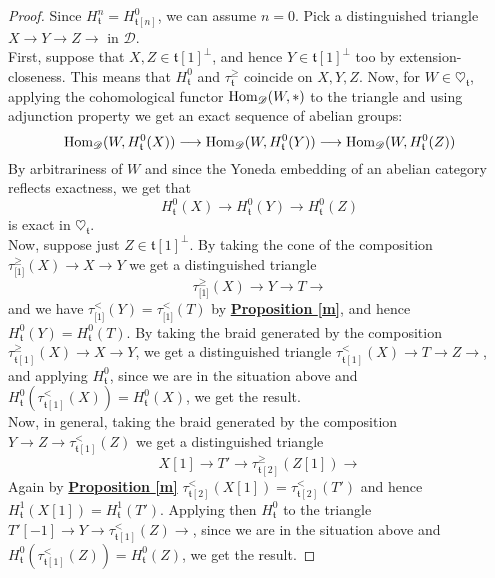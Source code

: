 \begin{proof}
Since $H^n_{\mathfrak{t}}=H^0_{\mathfrak{t}[n]}$, we can assume $n=0$. Pick a distinguished triangle $X \longrightarrow Y \longrightarrow Z \longrightarrow$ in $\mathscr{D}$. \\
First, suppose that $X,Z \in \mathfrak{t}[1]^{\perp}$, and hence $Y \in \mathfrak{t}[1]^{\perp}$ too by extension-closeness. This means that $H^0_{\mathfrak{t}}$ and $\tau^{\ge}_{\mathfrak{t}}$ coincide on $X,Y,Z$. Now, for $W \in \heartsuit_{\mathfrak{t}}$, applying the cohomological functor $\textnormal{Hom}_{\mathscr{D}}(W,*)$ to the triangle and using adjunction property we get an exact sequence of abelian groups: $$\textnormal{Hom}_{\mathscr{D}}(W,H_{\mathfrak{t}}^0(X)) \longrightarrow \textnormal{Hom}_{\mathscr{D}}(W,H_{\mathfrak{t}}^0(Y)) \longrightarrow \textnormal{Hom}_{\mathscr{D}}(W,H_{\mathfrak{t}}^0(Z))$$
By arbitrariness of $W$ and since the Yoneda embedding of an abelian category reflects exactness, we get that $$H_{\mathfrak{t}}^0(X) \longrightarrow H_{\mathfrak{t}}^0(Y) \longrightarrow H_{\mathfrak{t}}^0(Z)$$ is exact in $\heartsuit_{\mathfrak{t}}$. \\
Now, suppose just $Z \in \mathfrak{t}[1]^{\perp}$. By taking the cone of the composition $\tau^{\ge }_{\mathfrak[1]}(X) \longrightarrow X \longrightarrow Y$ we get a distinguished triangle $$\tau^{\ge }_{\mathfrak[1]}(X) \longrightarrow Y \longrightarrow T \longrightarrow $$ and we have $\tau^<_{\mathfrak[1]}(Y)=\tau^<_{\mathfrak[1]}(T)$ by \hyperref[m]{\textbf{Proposition \ref*{m}}}, and hence $H^0_{\mathfrak{t}}(Y)=H^0_{\mathfrak{t}}(T)$. By taking the braid generated by the composition $\tau^{\ge}_{\mathfrak{t}[1]}(X) \longrightarrow X \longrightarrow Y$, we get a distinguished triangle $\tau^{<}_{\mathfrak{t}[1]}(X) \longrightarrow T \longrightarrow Z \longrightarrow $, and applying $H^0_{\mathfrak{t}}$, since we are in the situation above and $H^0_{\mathfrak{t}}(\tau^{<}_{\mathfrak{t}[1]}(X))=H^0_{\mathfrak{t}}(X)$, we get the result. \\
Now, in general, taking the braid generated by the composition $Y \longrightarrow Z  \longrightarrow \tau^{<}_{\mathfrak{t}[1]}(Z)$ we get a distinguished triangle $$X[1] \longrightarrow T' \longrightarrow \tau^{\ge }_{\mathfrak{t}[2]}(Z[1]) \longrightarrow $$
Again by \hyperref[m]{\textbf{Proposition \ref*{m}}} $\tau^{<}_{\mathfrak{t}[2]}(X[1])=\tau^{<}_{\mathfrak{t}[2]}(T')$ and hence $H^1_{\mathfrak{t}}(X[1])=H^1_{\mathfrak{t}}(T')$. Applying then $H^0_{\mathfrak{t}}$ to the triangle $T'[-1] \longrightarrow Y \longrightarrow \tau^{<}_{\mathfrak{t}[1]}(Z) \longrightarrow $, since we are in the situation above and $H^0_{\mathfrak{t}}(\tau^{<}_{\mathfrak{t}[1]}(Z))=H^0_{\mathfrak{t}}(Z)$, we get the result. 
\end{proof}

